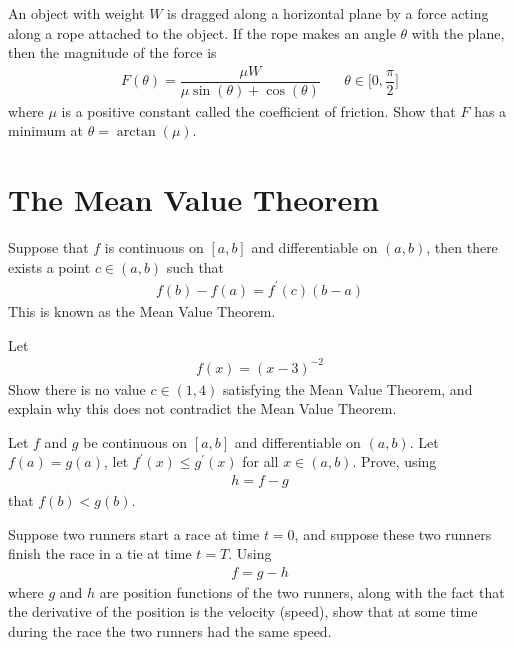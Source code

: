 \begin{exercise}
An object with weight $W$ is dragged along a horizontal plane by a force acting along a rope attached to the object. If the rope makes an angle $\theta$ with the plane, then the magnitude of the force is 
\begin{align*}
    F(\theta) = \dfrac{\mu W}{\mu \sin(\theta) + \cos(\theta)} \hspace{20pt} \theta \in \Big[0, \dfrac{\pi}{2}\Big] 
\end{align*}
where $\mu$ is a positive constant called the coefficient of friction. Show that $F$ has a minimum at $\theta = \arctan(\mu)$.
\end{exercise}

\newpage
\section{The Mean Value Theorem}

\begin{theorem}
Suppose that $f$ is continuous on $[a, b]$ and differentiable on $(a, b)$, then there exists a point $c \in (a, b)$ such that
\begin{align*}
    f(b) - f(a) = f^{'}(c)(b - a)
\end{align*}
This is known as the Mean Value Theorem.
\end{theorem}

\begin{exercise}
Let 
\begin{align*}
    f(x) = (x-3)^{-2}
\end{align*}
Show there is no value $c \in (1,4)$ satisfying the Mean Value Theorem, and explain why this does not contradict the Mean Value Theorem. 
\end{exercise}

\begin{exercise}
Let $f$ and $g$ be continuous on $[a, b]$ and differentiable on $(a, b)$. Let $f(a) = g(a)$, let $f^{'}(x) \leq g^{'}(x)$ for all $x \in (a, b)$. Prove, using
\begin{align*}
    h = f - g
\end{align*}
that $f(b) < g(b)$.
\end{exercise}

\begin{exercise}
Suppose two runners start a race at time $t = 0$, and suppose these two runners finish the race in a tie at time $t = T$. Using
\begin{align*}
    f = g - h
\end{align*}
where $g$ and $h$ are position functions of the two runners, along with the fact that the derivative of the position is the velocity (speed), show that at some time during the race the two runners had the same speed.
\end{exercise}

